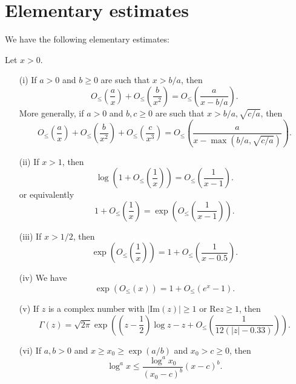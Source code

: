\section{Elementary estimates}

We have the following elementary estimates:

\begin{lemma}\label{elem-lem} Let $x > 0$.
\begin{itemize}
\item[(i)] If $a > 0$ and $b \geq 0$ are such that $x > b/a$, then
$$O_{\leq}\left(\frac{a}{x}\right) + O_{\leq}\left( \frac{b}{x^2}\right ) = O_{\leq}\left( \frac{a}{x-b/a} \right).$$
More generally, if $a > 0$ and $b,c \geq 0$ are such that $x > b/a, \sqrt{c/a}$, then
$$O_{\leq}\left(\frac{a}{x}\right) + O_{\leq}\left( \frac{b}{x^2} \right) + O_{\leq}\left( \frac{c}{x^3}\right) = O_{\leq}\left( \frac{a}{x-\max(b/a,\sqrt{c/a})} \right).$$
\item[(ii)]  If $x > 1$, then
$$\log\left(1 + O_{\leq}\left(\frac{1}{x}\right) \right) = O_{\leq}\left(\frac{1}{x-1}\right).$$
or equivalently
$$1 + O_{\leq}\left(\frac{1}{x}\right) = \exp\left( O_{\leq}\left(\frac{1}{x-1}\right) \right).$$
\item[(iii)]  If $x > 1/2$, then
$$\exp\left( O_{\leq}\left(\frac{1}{x}\right) \right) = 1 + O_{\leq}\left( \frac{1}{x-0.5} \right).$$
\item[(iv)]  We have
$$ \exp\left(O_{\leq}(x)\right) = 1 + O_{\leq}(e^x-1).$$
\item[(v)] If $z$ is a complex number with $|\mathrm{Im}(z)| \geq 1$ or $\mathrm{Re} z \geq 1$, then
$$ \Gamma(z) = \sqrt{2\pi} \exp\left( \left(z-\frac{1}{2}\right) \log z - z + O_{\leq}\left( \frac{1}{12(|z| - 0.33)} \right)\right).$$
\item[(vi)] If $a,b > 0$ and $x \geq x_0 \geq \exp(a/b)$ and $x_0 > c \geq 0$, then
$$\log^a x \leq \frac{\log^a x_0}{(x_0-c)^b} (x-c)^b.$$
\end{itemize}
\end{lemma}

